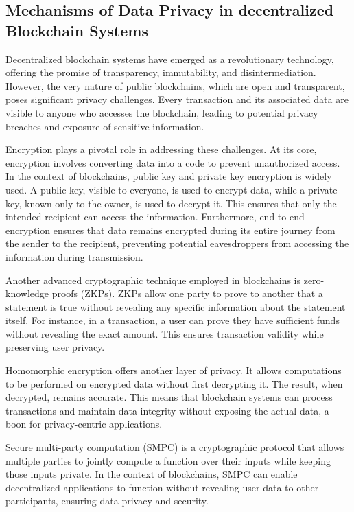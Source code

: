 \subsection{Mechanisms of Data Privacy in decentralized Blockchain Systems}
Decentralized blockchain systems have emerged as a revolutionary technology, offering the promise of transparency, immutability, and disintermediation. However, the very nature of public blockchains, which are open and transparent, poses significant privacy challenges. Every transaction and its associated data are visible to anyone who accesses the blockchain, leading to potential privacy breaches and exposure of sensitive information.

Encryption plays a pivotal role in addressing these challenges. At its core, encryption involves converting data into a code to prevent unauthorized access. In the context of blockchains, public key and private key encryption is widely used. A public key, visible to everyone, is used to encrypt data, while a private key, known only to the owner, is used to decrypt it. This ensures that only the intended recipient can access the information. Furthermore, end-to-end encryption ensures that data remains encrypted during its entire journey from the sender to the recipient, preventing potential eavesdroppers from accessing the information during transmission.

Another advanced cryptographic technique employed in blockchains is zero-knowledge proofs (ZKPs). ZKPs allow one party to prove to another that a statement is true without revealing any specific information about the statement itself. For instance, in a transaction, a user can prove they have sufficient funds without revealing the exact amount. This ensures transaction validity while preserving user privacy.

Homomorphic encryption offers another layer of privacy. It allows computations to be performed on encrypted data without first decrypting it. The result, when decrypted, remains accurate. This means that blockchain systems can process transactions and maintain data integrity without exposing the actual data, a boon for privacy-centric applications.

Secure multi-party computation (SMPC) is a cryptographic protocol that allows multiple parties to jointly compute a function over their inputs while keeping those inputs private. In the context of blockchains, SMPC can enable decentralized applications to function without revealing user data to other participants, ensuring data privacy and security.

